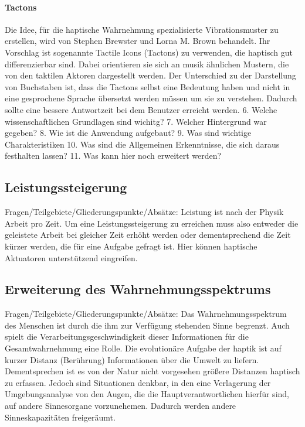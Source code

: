 \documentclass{llncs}					%
\begin{document}
\paragraph{Tactons} Die Idee, für die haptische Wahrnehmung spezialisierte Vibrationsmuster zu erstellen, wird von Stephen Brewster und Lorna M. Brown\cite{Brewster:2004:TST:976310.976313} behandelt. Ihr Vorschlag ist sogenannte Tactile Icons (Tactons) zu verwenden, die haptisch gut differenzierbar sind. Dabei orientieren sie sich an musik ähnlichen Mustern, die von den taktilen Aktoren dargestellt werden\cite{Brewster:2004:TST:976310.976313}.
Der Unterschied zu der Darstellung von Buchstaben ist, dass die Tactons selbst eine Bedeutung haben und nicht in eine gesprochene Sprache übersetzt werden müssen um sie zu verstehen. Dadurch sollte eine bessere Antwortzeit bei dem Benutzer erreicht werden.
6.	Welche wissenschaftlichen Grundlagen sind wichitg?
7.	Welcher Hintergrund war gegeben?
8.	Wie ist die Anwendung aufgebaut?
9.	Was sind wichtige Charakteristiken
10.	Was sind die Allgemeinen Erkenntnisse, die sich daraus festhalten lassen?
11.	Was kann hier noch erweitert werden?


\subsection{Leistungssteigerung}
Fragen/Teilgebiete/Gliederungspunkte/Absätze:
Leistung ist nach der Physik Arbeit pro Zeit. Um eine Leistungssteigerung zu erreichen muss also entweder die geleistete Arbeit bei gleicher Zeit erhöht werden oder dementsprechend die Zeit kürzer werden, die für eine Aufgabe gefragt ist.
Hier können haptische Aktuatoren unterstützend eingreifen.


\subsection{Erweiterung des Wahrnehmungsspektrums}
Fragen/Teilgebiete/Gliederungspunkte/Absätze:
Das Wahrnehmungsspektrum des Menschen ist durch die ihm zur Verfügung stehenden Sinne begrenzt. Auch spielt die Verarbeitungsgeschwindigkeit dieser Informationen für die Gesamtwahrnehmung eine Rolle.
Die evolutionäre Aufgabe der haptik ist auf kurzer Distanz (Berührung) Informationen über die Umwelt zu liefern. Dementsprechen ist es von der Natur nicht vorgesehen größere Distanzen haptisch zu erfassen.
Jedoch sind Situationen denkbar, in den eine Verlagerung der Umgebungsanalyse von den Augen, die die Hauptverantwortlichen hierfür sind, auf andere Sinnesorgane vorzunehemen. Dadurch werden andere Sinneskapazitäten freigeräumt.
\end{document}
